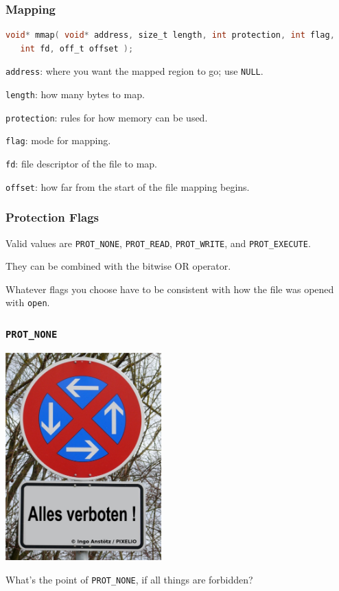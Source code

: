 \begin{frame}[fragile]
	\frametitle{Mapping}
	\begin{lstlisting}[language=C]
void* mmap( void* address, size_t length, int protection, int flag,
   int fd, off_t offset );
\end{lstlisting}

	\texttt{address}: where you want the mapped region to go; use \texttt{NULL}.

	\texttt{length}: how many bytes to map.

	\texttt{protection}: rules for how memory can be used.

	\texttt{flag}: mode for mapping.

	\texttt{fd}: file descriptor of the file to map.

	\texttt{offset}: how far from the start of the file mapping begins.

\end{frame}


\begin{frame}
	\frametitle{Protection Flags}

	Valid values are \texttt{PROT\_NONE}, \texttt{PROT\_READ}, \texttt{PROT\_WRITE}, and \texttt{PROT\_EXECUTE}.

	They can be combined with the bitwise OR operator.

	Whatever flags you choose have to be consistent with how the file was opened with \texttt{open}.

\end{frame}


\begin{frame}
	\frametitle{\texttt{PROT\_NONE}}

	\begin{center}
		\includegraphics[width=0.45\textwidth]{images/AllesVerboten.jpg}
	\end{center}

	What's the point of \texttt{PROT\_NONE}, if all things are forbidden?

\end{frame}


